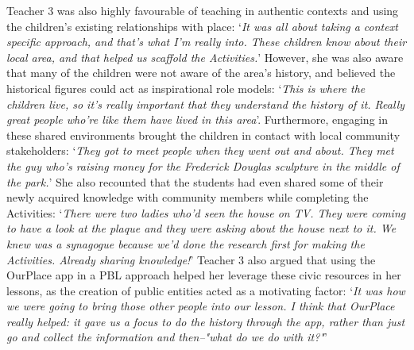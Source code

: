 \documentclass[,hyphens]{sigchi}
\begin{document}
Teacher 3 was also highly favourable of teaching in authentic contexts and using the children's existing relationships with place: `\textit{It was all about taking a context specific approach, and that's what I'm really into. These children know about their local area, and that helped us scaffold the Activities.}' However, she was also aware that many of the children were not aware of the area's history, and believed the historical figures could act as inspirational role models: `\textit{This is where the children live, so it's really important that they understand the history of it. Really great people who're like them have lived in this area}'. Furthermore, engaging in these shared environments brought the children in contact with local community stakeholders: `\textit{They got to meet people when they went out and about. They met the guy who's raising money for the Frederick Douglas sculpture in the middle of the park.}' She also recounted that the students had even shared some of their newly acquired knowledge with community members while completing the Activities: `\textit{There were two ladies who'd seen the house on TV. They were coming to have a look at the plaque and they were asking about the house next to it. We knew was a synagogue because we'd done the research first for making the Activities. Already sharing knowledge!}' Teacher 3 also argued that using the OurPlace app in a PBL approach helped her leverage these civic resources in her lessons, as the creation of public entities acted as a motivating factor: `\textit{It was how we were going to bring those other people into our lesson. I think that OurPlace really helped: it gave us a focus to do the history through the app, rather than just go and collect the information and then--"what do we do with it?"}' 
\end{document}
